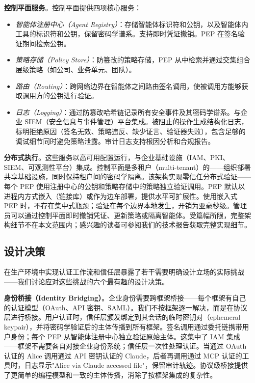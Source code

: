 \textbf{控制平面服务}。控制平面提供四项核心服务：
\begin{itemize}
\item \textit{智能体注册中心（Agent Registry）}：存储智能体标识符和公钥，以及智能体内工具的标识符和公钥，保留密码学谱系。支持即时凭证撤销。PEP 在签名验证期间检索公钥。

\item \textit{策略存储（Policy Store）}：防篡改的策略存储，PEP 从中检索并通过交集组合层级策略（如公司、业务单元、团队）。

\item \textit{路由（Routing）}：跨网络边界在智能体之间路由签名调用，使被调用方能够获取调用方的公钥进行验证。

\item \textit{日志（Logging）}：通过防篡改哈希链记录所有安全事件及其密码学谱系。与企业 SIEM（安全信息与事件管理）平台集成。被阻止的操作生成结构化日志，标明拒绝原因（签名无效、策略违反、缺少证言、验证器失败），包含足够的调试细节同时避免策略泄露。审计日志支持根因分析和合规报告。
\end{itemize}

\textbf{分布式执行}。这些服务以高可用配置运行，与企业基础设施（IAM、PKI、SIEM、可观测性平台）集成。控制平面是多租户（multi-tenant）的——组织部署共享基础设施，同时保持租户间的密码学隔离。该架构实现零信任分布式验证——每个 PEP 使用注册中心的公钥和策略存储中的策略独立验证调用。PEP 默认以进程内方式嵌入（链接库）或作为边车部署，提供水平可扩展性。使用嵌入式 PEP 时，不存在集中式瓶颈；验证在每个边界本地发生，开销为亚毫秒级。管理员可以通过控制平面即时撤销凭证、更新策略或隔离智能体。受篇幅所限，完整架构细节不在本文范围内；感兴趣的读者可参阅我们的技术报告获取完整实现细节。

\subsection{设计决策}

在生产环境中实现认证工作流和信任层暴露了若干需要明确设计立场的实际挑战——我们讨论应对这些挑战的六个最有趣的设计决策。

\textbf{身份桥接（Identity Bridging）}。企业身份需要跨框架桥接——每个框架有自己的认证模型（OAuth、API 密钥、SAML）。我们不按框架逐一解决，而是在协议层进行桥接。用户认证时，信任层颁发绑定到其会话的临时密钥对（ephemeral keypair），并将密码学验证后的主体传播到所有框架。签名调用通过委托链携带用户身份；每个 PEP 从智能体注册中心独立验证原始主体。这集中了 IAM 集成——框架不需要各自对接企业身份系统；信任层一次性处理认证。当通过 OAuth 认证的 Alice 调用通过 API 密钥认证的 Claude，后者再调用通过 MCP 认证的工具时，日志显示"Alice via Claude accessed file"，保留审计轨迹。协议级桥接提供了更简单的编程模型和一致的主体传播，消除了按框架集成的复杂性。

